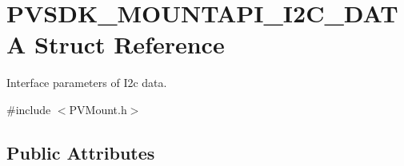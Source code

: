 \hypertarget{struct_p_v_s_d_k___m_o_u_n_t_a_p_i___i2_c___d_a_t_a}{}\section{P\+V\+S\+D\+K\+\_\+\+M\+O\+U\+N\+T\+A\+P\+I\+\_\+\+I2\+C\+\_\+\+D\+A\+TA Struct Reference}
\label{struct_p_v_s_d_k___m_o_u_n_t_a_p_i___i2_c___d_a_t_a}


Interface parameters of I2c data.  




{\ttfamily \#include $<$P\+V\+Mount.\+h$>$}

\subsection*{Public Attributes}
